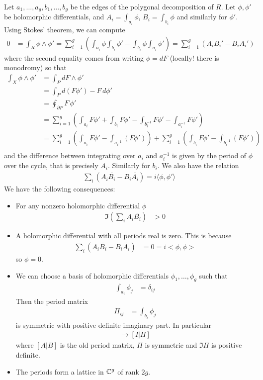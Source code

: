 \documentclass[12pt]{article}
\begin{document}
Let $a_1, \ldots, a_g, b_1, \ldots, b_g$ be the edges of the polygonal decomposition of $R$. Let $\phi, \phi'$ be holomorphic differentials, and $A_i = \int_{a_i} \phi$, $B_i = \int_{b_i} \phi$ and similarly for $\phi'$. Using Stokes' theorem, we can compute \begin{align*}
    0 & = \int_R \phi \wedge \phi' = \sum_{i=1}^g \left( \int_{a_i} \phi \int_{b_i} \phi' - \int_{b_i} \phi \int_{a_i} \phi' \right) = \sum_{i=1}^g (A_i B_i' - B_i A_i')
\end{align*} where the second equality comes from writing $\phi = dF$ (locally! there is monodromy) so that \begin{align*}
    \int_X \phi \wedge \phi' &= \int_P dF\wedge\phi' \\
    &= \int_P d(F\phi')-F\,d\phi' \\
&= \oint_{\partial P} F\,\phi' \\
&= \sum_{i=1}^g \left( \int_{a_i} F\phi' + \int_{b_i} F\phi' - \int_{b_i^{-1}} F\phi' - \int_{a_i^{-1}} F\phi' \right) \\
&= \sum_{i=1}^g \left( \int_{a_i}F\phi' - \int_{a_i^{-1}} (F\phi') \right) + \sum_{i=1}^g \left( \int_{b_i} F\phi' - \int_{b_i^{-1}} (F\phi') \right) \\
\end{align*} and the difference between integrating over $a_i$ and $a_i^{-1}$ is given by the period of $\phi$ over the cycle, that is precisely $A_i$. Similarly for $b_i$.
We also have the relation \begin{align*}
    \sum_i (A_i \overline{B_i} - B_i \overline{A_i}) = i\langle\phi, \phi'\rangle
\end{align*} 
We have the following consequences:
\begin{itemize}
    \item For any nonzero holomorphic differential $\phi$
\begin{align*}
    \Im( \sum _i A_i \overline{B_i} ) & > 0
\end{align*} 
\item A holomorphic differential with all periods real is zero. This is because \begin{align*}
    \sum_i (A_i \overline{B_i} - B_i \overline{A_i}) & = 0 = i<\phi, \phi>
\end{align*} so $\phi = 0$.
\item We can choose a basis of holomorphic differentials $\phi_1, \ldots, \phi_g$ such that \begin{align*}
    \int_{a_i} \phi_j & = \delta_{ij}
\end{align*} Then the period matrix \begin{align*}
    \Pi_{ij} & = \int_{b_i} \phi_j
\end{align*} is symmetric with positive definite imaginary part. In particular \begin{align*}
    [A | B] \to [I | \Pi]
\end{align*} where $[A|B]$ is the old period matrix, $\Pi$ is symmetric and $\Im \Pi$ is positive definite.
\item The periods form a lattice in $\mathbb{C}^g$ of rank $2g$.
\end{itemize} 
\end{document}
